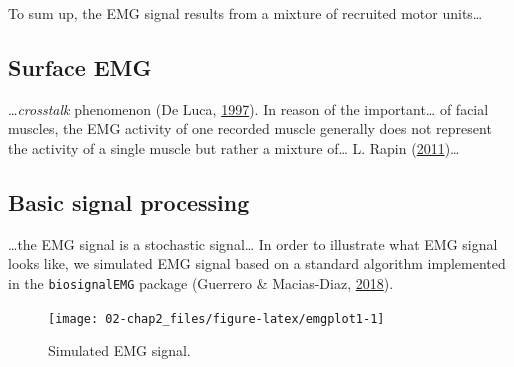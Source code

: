 \documentclass[a4paper,12pt,twoside,openright,oldfontcommands]{memoir}
\newenvironment{Shaded}{}{}
\newcommand{\KeywordTok}[1]{\textcolor[rgb]{0.00,0.44,0.13}{\textbf{#1}}}
\newcommand{\DataTypeTok}[1]{\textcolor[rgb]{0.56,0.13,0.00}{#1}}
\newcommand{\DecValTok}[1]{\textcolor[rgb]{0.25,0.63,0.44}{#1}}
\newcommand{\FloatTok}[1]{\textcolor[rgb]{0.25,0.63,0.44}{#1}}
\newcommand{\StringTok}[1]{\textcolor[rgb]{0.25,0.44,0.63}{#1}}
\newcommand{\OperatorTok}[1]{\textcolor[rgb]{0.40,0.40,0.40}{#1}}
\newcommand{\NormalTok}[1]{#1}
\begin{document}
To sum up, the EMG signal results from a mixture of recruited motor
units\ldots{}

\subsection{Surface EMG}\label{surface-emg}

\ldots{}\emph{crosstalk} phenomenon (De Luca,
\protect\hyperlink{ref-de_luca_use_1997}{1997}). In reason of the
important\ldots{} of facial muscles, the EMG activity of one recorded
muscle generally does not represent the activity of a single muscle but
rather a mixture of\ldots{} L. Rapin
(\protect\hyperlink{ref-Rapin2011}{2011})\ldots{}

\subsection{Basic signal processing}\label{basic-signal-processing}

\ldots{}the EMG signal is a stochastic signal\ldots{} In order to
illustrate what EMG signal looks like, we simulated EMG signal based on
a standard algorithm implemented in the \texttt{biosignalEMG} package
(Guerrero \& Macias-Diaz, \protect\hyperlink{ref-R-biosignalEMG}{2018}).

\begin{Shaded}
\end{Shaded}

\begin{figure}[H]

{\centering \texttt{[image: 02-chap2\_files/figure-latex/emgplot1-1]} 

}

\caption{Simulated EMG signal.}\label{fig:emgplot1}
\end{figure}
\end{document}
